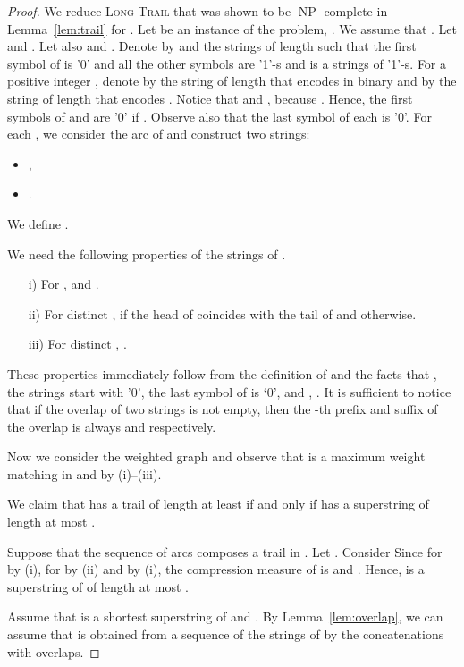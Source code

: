 \documentclass[11pt]{article}
\DeclareMathOperator{\operatorClassNP}{NP}
\newcommand{\classNP}{\ensuremath{\operatorClassNP}}
\begin{document}
\begin{proof}
We reduce \textsc{Long Trail} that was shown to be \classNP-complete in Lemma~\ref{lem:trail} for . Let  be an instance of the problem, . We assume that . Let  and .
Let also  and . Denote by  and  the strings of length  such that the first symbol of  is '0' and all the other symbols are '1'-s and  is a strings of '1'-s.
For a positive integer , denote by  the string of length  that encodes  in binary and by  the string of length  that encodes . 
Notice that  and , because . Hence, the first symbols of  and  are '0' if . Observe also that the last symbol of each  is '0'. 
For each , we consider the arc  of  and construct two strings:
\begin{itemize}
\item , 
\item .
\end{itemize}
We define .

We need the following properties of the strings of .
\begin{itemize}
 \item[i)] For ,  and .
 \item[ii)] For distinct ,  if the head of  coincides with the tail of  and   otherwise.
 \item[iii)] For distinct , .
\end{itemize}
These properties immediately follow from the definition of  and the facts that , the strings  start with '0', the last symbol of  is \lq{}0',  and , . It is sufficient to notice that if the overlap of two strings is not empty, then the -th prefix and suffix of the overlap is always  and  respectively.

Now we consider the weighted graph  and observe that  is a maximum weight matching in  and  by (i)--(iii).

We claim that  has a  trail of length at least  if and only if  has a superstring of length at most .

Suppose that the sequence of arcs  composes a trail in . Let .
Consider 
Since  for  by (i),  for  by (ii) and
 by (i), the compression measure of  is  and 
. Hence,  is a superstring of  of length at most .

Assume that  is a shortest superstring of  and . By Lemma~\ref{lem:overlap}, we can assume that  is obtained from a sequence  of the strings of  by the concatenations with overlaps.


\end{proof}
\end{document}
